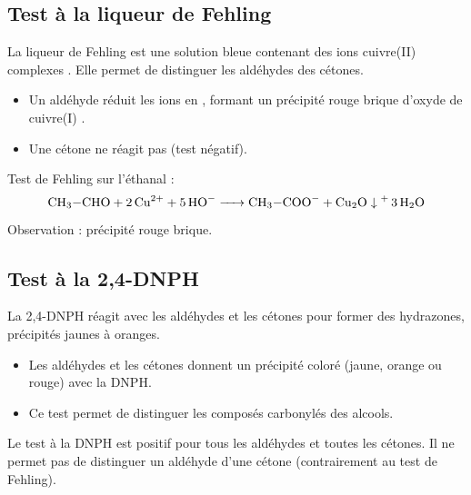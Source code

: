 \subsection{Test à la liqueur de Fehling}

\begin{experience}
La liqueur de Fehling est une solution bleue contenant des ions cuivre(II) complexes . Elle permet de distinguer les aldéhydes des cétones.
\end{experience}

\begin{propriete}
\begin{itemize}
\item Un aldéhyde réduit les ions  en , formant un précipité rouge brique d'oxyde de cuivre(I) .
\item Une cétone ne réagit pas (test négatif).
\end{itemize}
\end{propriete}

\begin{exemple}
Test de Fehling sur l'éthanal :
\[\ce{CH3-CHO + 2 Cu^2+ + 5 HO- -> CH3-COO- + Cu2O\downarrow + 3 H2O}\]
Observation : précipité rouge brique.
\end{exemple}

\subsection{Test à la 2,4-DNPH}

\begin{experience}
La 2,4-DNPH réagit avec les aldéhydes et les cétones pour former des hydrazones, précipités jaunes à oranges.
\end{experience}

\begin{propriete}
\begin{itemize}
\item Les aldéhydes et les cétones donnent un précipité coloré (jaune, orange ou rouge) avec la DNPH.
\item Ce test permet de distinguer les composés carbonylés des alcools.
\end{itemize}
\end{propriete}

\begin{remarque}
Le test à la DNPH est positif pour tous les aldéhydes et toutes les cétones. Il ne permet pas de distinguer un aldéhyde d'une cétone (contrairement au test de Fehling).
\end{remarque}

